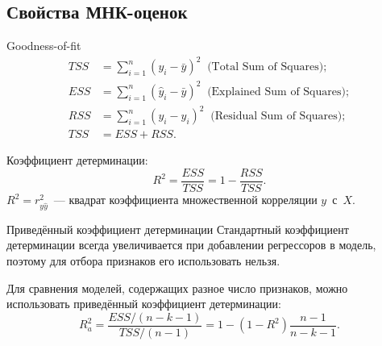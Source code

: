 \documentclass[9pt,pdf,utf8,hyperref={unicode},aspectratio=169]{beamer}
\begin{document}
\subsection{Свойства МНК-оценок}
\begin{frame}{Goodness-of-fit}
    \begin{align*}
    TSS &= \sum_{i=1}^n \left(y_i - \bar{y}\right)^2 \;\; \text{(Total Sum of Squares)}; \\
    ESS &= \sum_{i=1}^n \left(\hat{y}_i - \bar{y}\right)^2 \;\; \text{(Explained Sum of Squares)}; \\
    RSS &= \sum_{i=1}^n \left(y_i - \hat{y}_i\right)^2 \;\; \text{(Residual Sum of Squares)}; \\
    TSS &= ESS + RSS.
    \end{align*}

    \bigskip

    Коэффициент детерминации:
    $$R^2 = \frac{ESS}{TSS} = 1 - \frac{RSS}{TSS}.$$
    $R^2 = r^2_{y\hat{y}}$~--- квадрат коэффициента множественной корреляции $y$~с~$X$.
\end{frame}

\begin{frame}{Приведённый коэффициент детерминации}
    Стандартный коэффициент детерминации всегда увеличивается при добавлении регрессоров в модель, поэтому для отбора признаков его использовать нельзя.

    \bigskip

    Для сравнения моделей, содержащих разное число признаков, можно использовать приведённый коэффициент детерминации:
    $$R^2_a = \frac{ESS/(n-k-1)}{TSS/(n-1)} = 1 - \left(1-R^2\right)\frac{n-1}{n-k-1}.$$
\end{frame}
\end{document}
